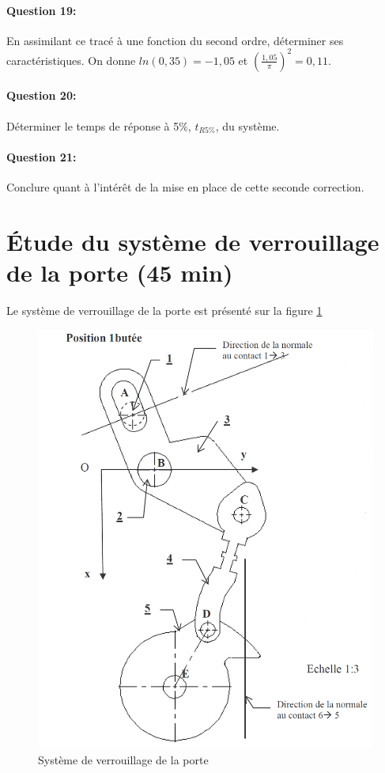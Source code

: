 \paragraph{Question 19:} En assimilant ce tracé à une fonction du second ordre, déterminer ses caractéristiques. On donne $ln(0,35)=-1,05$ et $(\frac{1,05}{\pi})^2=0,11$.


\paragraph{Question 20:} Déterminer le temps de réponse à 5\%, $t_{R5\%}$, du système.

\paragraph{Question 21:} Conclure quant à l'intérêt de la mise en place de cette seconde correction.

\newpage

\section{Étude du système de verrouillage de la porte (45 min)}

Le système de verrouillage de la porte est présenté sur la figure \ref{fig13}

\begin{figure}[!h]
 \centering\includegraphics[width=0.7\linewidth]{img/Portes15}
 \caption{Système de verrouillage de la porte}
 \label{fig13}
\end{figure}

